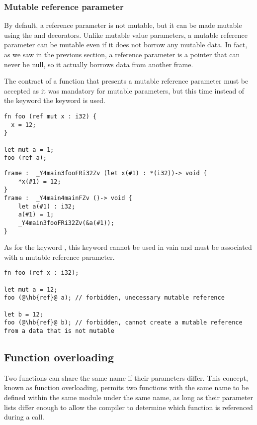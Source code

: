 \subsubsection{Mutable reference parameter}
\label{sec:mut_ref_param}

By default, a reference parameter is not mutable, but it can be made mutable
using the  and  decorators. Unlike mutable value
parameters, a mutable reference parameter can be mutable even if it does not
borrow any mutable data. In fact, as we saw in the previous section, a reference
parameter is a pointer that can never be null, so it actually borrows data from
another frame.

The contract of a function that presents a mutable reference parameter must be
accepted as it was mandatory for mutable parameters, but this time instead of
the keyword  the keyword  is used.

\begin{lstlisting}[style=coloredverbatim]
fn foo (ref mut x : i32) {
  x = 12;
}

let mut a = 1;
foo (ref a);
\end{lstlisting}

\begin {lstlisting}[style=intermediateVerb]
frame :  _Y4main3fooFRi32Zv (let x(#1) : *(i32))-> void {
    *x(#1) = 12;
}
frame :  _Y4main4mainFZv ()-> void {
    let a(#1) : i32;
    a(#1) = 1;
    _Y4main3fooFRi32Zv(&a(#1));
}
\end{lstlisting}

 As for the keyword
, this keyword  cannot be used in vain and must be
associated with a mutable reference parameter.

\begin{lstlisting}[style=coloredverbatim, escapechar=@]
fn foo (ref x : i32);

let mut a = 12;
foo (@\hb{ref}@ a); // forbidden, unecessary mutable reference

let b = 12;
foo (@\hb{ref}@ b); // forbidden, cannot create a mutable reference from a data that is not mutable
\end{lstlisting}

\subsection{Function overloading}
\label{sec:function_overloading}

Two functions can share the same name if their parameters differ. This concept,
known as function overloading, permits two functions with the same name to be
defined within the same module under the same name, as long as their parameter
lists differ enough to allow the compiler to determine which function is
referenced during a call.


